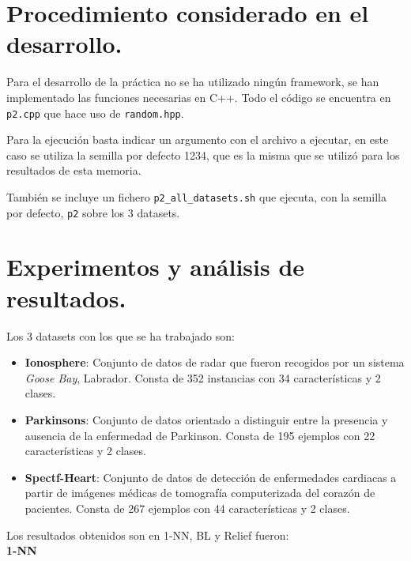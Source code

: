 \documentclass[11pt,a4paper]{article}
\theoremstyle{definition}
\begin{document}
	\section{Procedimiento considerado en el desarrollo.}
	Para el desarrollo de la práctica no se ha utilizado ningún framework, se han implementado las funciones necesarias en C++. Todo el código se encuentra en \texttt{p2.cpp} que hace uso de \texttt{random.hpp}.
	
	Para la ejecución basta indicar un argumento con el archivo a ejecutar, en este caso se utiliza la semilla por defecto 1234, que es la misma que se utilizó para los resultados de esta memoria.
	
	También se incluye un fichero \texttt{p2\_all\_datasets.sh} que ejecuta, con la semilla por defecto, \texttt{p2} sobre los 3 datasets.
	
	\section{Experimentos y análisis de resultados.}
	Los 3 datasets con los que se ha trabajado son:
	\begin{itemize}
		\item \textbf{Ionosphere}: Conjunto de datos de radar que fueron recogidos por un sistema \textit{Goose Bay}, Labrador. Consta de 352 instancias con 34 características y 2 clases.
		\item \textbf{Parkinsons}: Conjunto de datos orientado a distinguir entre la presencia y ausencia de la enfermedad de Parkinson. Consta de 195 ejemplos con 22 características y 2 clases.
		\item \textbf{Spectf-Heart}: Conjunto de datos de detección de enfermedades cardiacas a partir de imágenes médicas de tomografía computerizada del corazón de pacientes. Consta de 267 ejemplos con 44 características y 2 clases.
	\end{itemize}
	
	Los resultados obtenidos son en 1-NN, BL y Relief fueron:~\\
	
		\textbf{1-NN}
\end{document}
